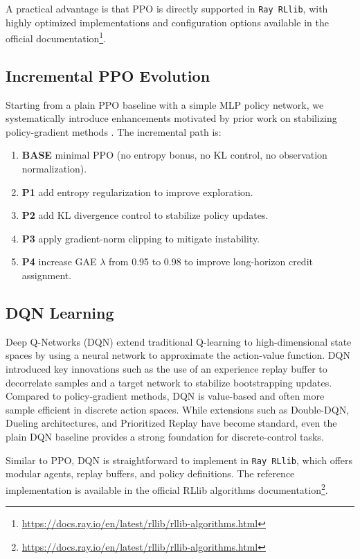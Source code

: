 A practical advantage is that PPO is directly supported in \texttt{Ray RLlib},
with highly optimized implementations and configuration options available in
the official documentation\footnote{\url{https://docs.ray.io/en/latest/rllib/rllib-algorithms.html}}.


\subsection{Incremental PPO Evolution}

Starting from a plain PPO baseline with a simple MLP policy network, we
systematically introduce enhancements motivated by prior work on stabilizing
policy-gradient methods \cite{arulkumaran2017deep}. The incremental path is:

\begin{enumerate}
    \item \textbf{BASE} minimal PPO (no entropy bonus, no KL control, no observation normalization).
    \item \textbf{P1}  add entropy regularization to improve exploration.
    \item \textbf{P2}  add KL divergence control to stabilize policy updates.
    \item \textbf{P3}  apply gradient-norm clipping to mitigate instability.
    \item \textbf{P4}  increase GAE $\lambda$ from 0.95 to 0.98 to improve long-horizon credit assignment.
\end{enumerate}

\subsection{DQN Learning}

Deep Q-Networks (DQN) \cite{mnih2015human} extend traditional Q-learning to
high-dimensional state spaces by using a neural network to approximate the
action-value function. DQN introduced key innovations such as the use of an
experience replay buffer to decorrelate samples and a target network to
stabilize bootstrapping updates. Compared to policy-gradient methods, DQN is
value-based and often more sample efficient in discrete action spaces. While
extensions such as Double-DQN, Dueling architectures, and Prioritized Replay
have become standard, even the plain DQN baseline provides a strong foundation
for discrete-control tasks. 

Similar to PPO, DQN is straightforward to implement in \texttt{Ray RLlib},
which offers modular agents, replay buffers, and policy definitions. The
reference implementation is available in the official RLlib algorithms
documentation\footnote{\url{https://docs.ray.io/en/latest/rllib/rllib-algorithms.html}}.
